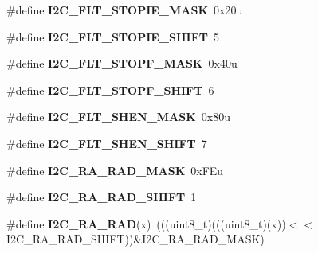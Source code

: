 \begin{DoxyCompactItemize}
\#define {\bfseries I2\+C\+\_\+\+F\+L\+T\+\_\+\+S\+T\+O\+P\+I\+E\+\_\+\+M\+A\+SK}~0x20u
\item 
\mbox{\label{group___i2_c___register___masks_ga74a7ab061627ad3188d0076c7e0209d2}} 
\#define {\bfseries I2\+C\+\_\+\+F\+L\+T\+\_\+\+S\+T\+O\+P\+I\+E\+\_\+\+S\+H\+I\+FT}~5
\item 
\mbox{\label{group___i2_c___register___masks_ga49bb44800a0defc2dd1efb27263f7c52}} 
\#define {\bfseries I2\+C\+\_\+\+F\+L\+T\+\_\+\+S\+T\+O\+P\+F\+\_\+\+M\+A\+SK}~0x40u
\item 
\mbox{\label{group___i2_c___register___masks_gae69dbb7d8bd1dff50e5c30846d3285bb}} 
\#define {\bfseries I2\+C\+\_\+\+F\+L\+T\+\_\+\+S\+T\+O\+P\+F\+\_\+\+S\+H\+I\+FT}~6
\item 
\mbox{\label{group___i2_c___register___masks_gac404fda03fc23c08a56018d6ab2fc977}} 
\#define {\bfseries I2\+C\+\_\+\+F\+L\+T\+\_\+\+S\+H\+E\+N\+\_\+\+M\+A\+SK}~0x80u
\item 
\mbox{\label{group___i2_c___register___masks_ga5d6c7b67f99e1f592d199bb77f7d5605}} 
\#define {\bfseries I2\+C\+\_\+\+F\+L\+T\+\_\+\+S\+H\+E\+N\+\_\+\+S\+H\+I\+FT}~7
\item 
\mbox{\label{group___i2_c___register___masks_gaa39c37c0d41e4cdafc00884a2fc791fa}} 
\#define {\bfseries I2\+C\+\_\+\+R\+A\+\_\+\+R\+A\+D\+\_\+\+M\+A\+SK}~0x\+F\+Eu
\item 
\mbox{\label{group___i2_c___register___masks_ga8571ae2c33f4ea6503f568c2151ef2a9}} 
\#define {\bfseries I2\+C\+\_\+\+R\+A\+\_\+\+R\+A\+D\+\_\+\+S\+H\+I\+FT}~1
\item 
\mbox{\label{group___i2_c___register___masks_gae2a3d76c69fe5e8947660274f6744031}} 
\#define {\bfseries I2\+C\+\_\+\+R\+A\+\_\+\+R\+AD}(x)~(((uint8\+\_\+t)(((uint8\+\_\+t)(x))$<$$<$I2\+C\+\_\+\+R\+A\+\_\+\+R\+A\+D\+\_\+\+S\+H\+I\+FT))\&I2\+C\+\_\+\+R\+A\+\_\+\+R\+A\+D\+\_\+\+M\+A\+SK)
\item 
\mbox{\label{group___i2_c___register___masks_gad123ad3f9e1362d2ee5bd403cdf34327}} 
$$
\end{DoxyCompactItemize}
